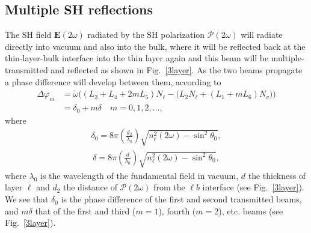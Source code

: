 \documentclass[10pt]{book}
\begin{document}
\subsection{Multiple SH reflections}

The SH field $\mathbf{E}(2\omega)$ radiated by the SH polarization 
$\boldsymbol{\mathcal{P}}(2\omega)$
will radiate directly into vacuum and also into the bulk,
where it will be reflected back at the thin-layer-bulk interface into 
the thin layer again and this beam will be multiple-transmitted and 
reflected as shown in Fig.~\ref{3layer}. 
As the two beams propagate a phase difference will develop between
them, according to
\begin{align}\label{m99}
\Delta\varphi_m&=\tilde{\omega}\Big((L_3+L_4+2mL_5)N_\ell
-\big( L_2N_\ell+(L_1+mL_6)N_v\big)
\Big)
\nonumber\\
&=\delta_0 + m\delta\quad m=0,1,2,\ldots
,
\end{align}
where
\begin{align}\label{m97}
\delta_0=8\pi\left(\frac{d_2}{\lambda_0}\right)\sqrt{n^2_\ell(2\omega)-\sin^2\theta_0}
,
\end{align}
\begin{align}\label{m96}
\delta=8\pi\left(\frac{d}{\lambda_0}\right)\sqrt{n^2_\ell(2\omega)-\sin^2\theta_0}
,
\end{align}
where $\lambda_0$ is the wavelength of the fundamental field in
vacuum, $d$ the thickness of layer $\ell$ and $d_2$ the distance of
$\boldsymbol{\mathcal{P}}(2\omega)$  
from the $\ell b$ interface 
(see Fig.~\ref{3layer}).
We see that
$\delta_0$ is the phase difference of 
the first and second transmitted beams, and $m\delta$ that of the first 
and  third ($m=1$), fourth ($m=2$), etc. beams (see 
Fig.~\ref{3layer}). 
\end{document}

